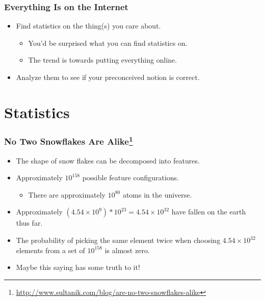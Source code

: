 \documentclass{beamer}
\begin{document}
\begin{frame}
\frametitle{Everything Is on the Internet}
\begin{itemize}
    \item Find statistics on the thing(s) you care about.
        \begin{itemize}
            \item You'd be surprised what you can find statistics on.
            \item The trend is towards putting everything online.
        \end{itemize}
    \item Analyze them to see if your preconceived notion is correct.
\end{itemize}
\end{frame}


\section{Statistics}


\begin{frame}
    \frametitle{No Two Snowflakes Are
    Alike\footnote{\url{http://www.sultanik.com/blog/are-no-two-snowflakes-alike}}}
\begin{itemize}
    \item The shape of snow flakes can be decomposed into features.
    \item Approximately $10^{158}$ possible feature configurations.
        \begin{itemize}
            \item There are approximately $10^{80}$ atoms in the universe.
        \end{itemize}
    \item Approximately $(4.54 \times 10^9) * 10^{23} = 4.54\times 10^{32}$
        have fallen on the earth thus far.
    \item The probability of picking the same element twice when choosing
    $4.54\times 10^{32}$ elements from a set of $10^{158}$ is almost zero. 
    \item Maybe this saying has some truth to it!
\end{itemize}
\end{frame}
\end{document}
